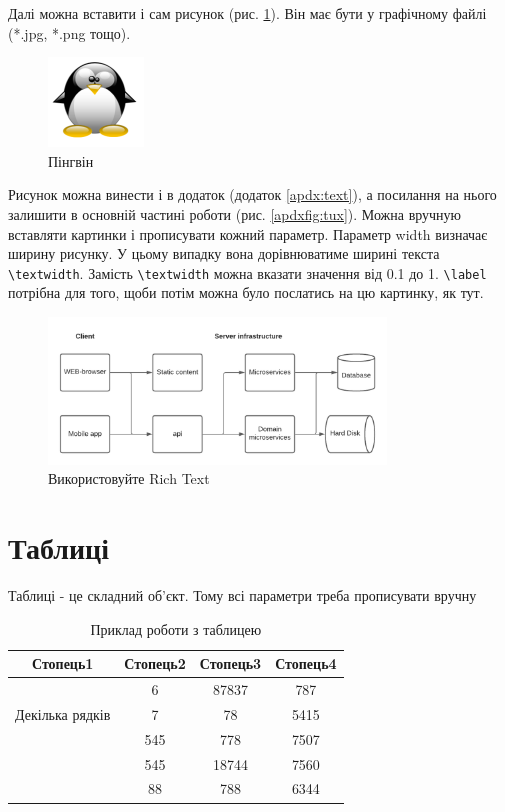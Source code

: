 Далі можна вставити і сам рисунок (рис. \ref{fig:tux}). Він має бути у графічному файлі ({*}.jpg, {*}.png тощо). 

\begin{figure}[h]
 \centering\includegraphics{img/Tux.png}
 \caption{Пінгвін}
 \label{fig:tux}
\end{figure}

Рисунок можна винести і в додаток (додаток \ref{apdx:text}), \label{linkpage} а посилання на нього залишити в основній частині роботи (рис. \ref{apdxfig:tux}).
Можна вручную вставляти картинки і прописувати кожний параметр.
Параметр width визначає ширину рисунку. У цьому випадку вона дорівнюватиме ширині текста \verb|\textwidth|. Замість \verb|\textwidth| можна вказати значення від 0.1 до 1. \verb|\label| потрібна для того, щоби потім можна було послатись на цю картинку, як тут.

\begin{figure}[!htb]
 \centering
 \includegraphics[width=0.8\textwidth]{img/fig1.png}
 \caption{Використовуйте Rich Text}
 \label{fig:fig1}
\end{figure}

\section{Таблиці}
Таблиці  - це складний об'єкт. Тому всі параметри треба прописувати вручну

\begin{table}[h!]
\centering
\begin{tabular}{|c|c|c|c|} 
 \hline
 Стопець1 & Стопець2 & Стопець3 & Стопець4 \\ [0.5ex] 
 \hline
 \multirow{3}{5em}{Декілька рядків} & 6 & 87837 & 787 \\ 
  &  7 & 78 & 5415 \\
   & 545 & 778 & 7507 \\
   & 545 & 18744 & 7560 \\
   & 88 & 788 & 6344 \\ [1ex] 
 \hline
\end{tabular}
\caption{Приклад роботи з таблицею}
\label{table:1}
\end{table}


